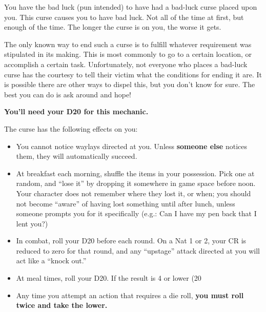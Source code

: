 \documentclass[green]{GL2020}
\begin{document}
\name{\\gBadLuckCurse{}}

You have the bad luck (pun intended) to have had a bad-luck curse placed upon you. This curse causes you to have bad luck. Not all of the time at first, but enough of the time. The longer the curse is on you, the worse it gets.

The only known way to end such a curse is to fulfill whatever requirement was stipulated in its making. This is most commonly to go to a certain location, or accomplish a certain task. Unfortunately, not everyone who places a bad-luck curse has the courtesy to tell their victim what the conditions for ending it are. It is possible there are other ways to dispel this, but you don’t know for sure. The best you can do is ask around and hope!

\textbf{You’ll need your D20  for this mechanic.}

The curse has the following effects on you:
\begin{itemize}
  \item You cannot notice waylays directed at you. Unless \textbf{someone else} notices them, they will automatically succeed.
  \item At breakfast each morning, shuffle the items in your possession. Pick one at random, and ``lose it'' by dropping it somewhere in game space before noon. Your character does not remember where they lost it, or when; you should not become ``aware'' of having lost something until after lunch, unless someone prompts you for it specifically (e.g.: Can I have my pen back that I lent you?)
  \item In combat, roll your D20 before each round. On a Nat 1 or 2, your CR is reduced to zero for that round, and any ``upstage'' attack directed at you will act like a ``knock out.''
  \item At meal times, roll your D20. If the result is 4 or lower (20%
  \item Any time you attempt an action that requires a die roll, \textbf{you must roll twice and take the lower.}
\end{itemize}
\end{document}
